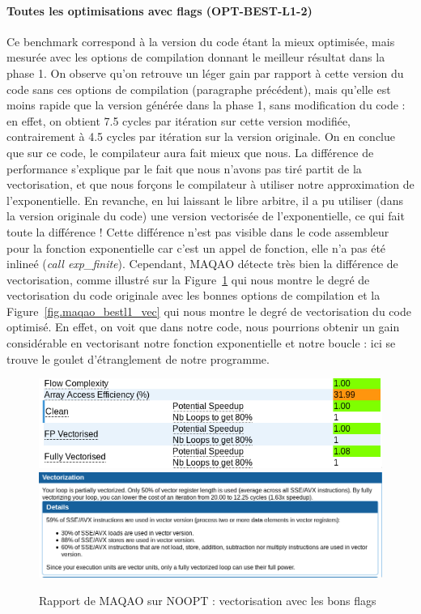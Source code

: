 \documentclass[12pt,a4paper]{article}
\begin{document}
\paragraph{Toutes les optimisations avec flags (OPT-BEST-L1-2)} Ce benchmark
correspond à la version du code étant la mieux optimisée, mais mesurée avec les
options de compilation donnant le meilleur résultat dans la phase 1. On observe
qu'on retrouve un léger gain par rapport à cette version du code sans ces
options de compilation (paragraphe précédent), mais qu'elle est moins rapide que
la version générée dans la phase 1, sans modification du code : en effet, on
obtient 7.5 cycles par itération sur cette version modifiée, contrairement à 4.5
cycles par itération sur la version originale. On en conclue que sur ce code, le
compilateur aura fait mieux que nous. La différence de performance s'explique
par le fait que nous n'avons pas tiré partit de la vectorisation, et que nous
forçons le compilateur à utiliser notre approximation de l'exponentielle. En
revanche, en lui laissant le libre arbitre, il a pu utiliser (dans la version
originale du code) une version vectorisée de l'exponentielle, ce qui fait toute
la différence ! Cette différence n'est pas visible dans le code assembleur pour
la fonction exponentielle car c'est un appel de fonction, elle n'a pas été
inlineé (\textit{call exp\_finite}). Cependant, MAQAO détecte très bien la
différence de vectorisation, comme illustré sur la
Figure~\ref{fig.maqao_noopt_vec} qui nous montre le degré de vectorisation du
code originale avec les bonnes options de compilation et la
Figure~\ref{fig.maqao_bestl1_vec} qui nous montre le degré de vectorisation du
code optimisé. En effet, on voit que dans notre code, nous pourrions obtenir un
gain considérable en vectorisant notre fonction exponentielle et notre boucle :
ici se trouve le goulet d'étranglement de notre programme.

\begin{figure}[p]
    \centering
    \includegraphics[scale=0.6]{figures/L1/maqao_noopt_flags.png}
    \includegraphics[scale=0.45]{figures/L1/maqao_noopt_flags_vec.png}
    \caption{Rapport de MAQAO sur NOOPT : vectorisation avec les bons flags}
    \label{fig.maqao_noopt_vec}
\end{figure}
\end{document}
